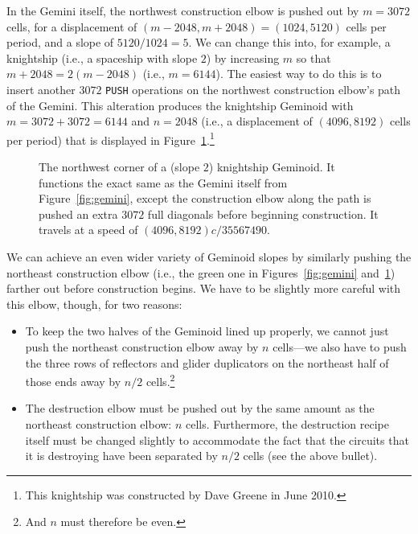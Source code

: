 In the Gemini itself, the northwest construction elbow is pushed out by $m = 3072$ cells, for a displacement of $(m-2048,m+2048) = (1024,5120)$ cells per period, and a slope of $5120/1024 = 5$. We can change this into, for example, a knightship (i.e., a spaceship with slope $2$) by increasing $m$ so that $m+2048 = 2(m-2048)$ (i.e., $m = 6144$). The easiest way to do this is to insert another $3072$ \texttt{PUSH} operations on the northwest construction elbow's path of the Gemini. This alteration produces the knightship Geminoid with $m = 3072 + 3072 = 6144$ and $n = 2048$ (i.e., a displacement of $(4096,8192)$ cells per period) that is displayed in Figure~\ref{fig:geminoid_knightship}.\footnote{This knightship was constructed by Dave Greene in June 2010.}

\begin{figure}[!htb]
	\centering
	\caption{The northwest corner of a (slope $2$) knightship Geminoid. It functions the exact same as the Gemini itself from Figure~\ref{fig:gemini}, except the construction elbow along the  path is pushed an extra $3072$ full diagonals before beginning construction. It travels at a speed of $(4096,8192)c/35567490$.}\label{fig:geminoid_knightship}
\end{figure}

We can achieve an even wider variety of Geminoid slopes by similarly pushing the northeast construction elbow (i.e., the green one in Figures~\ref{fig:gemini} and~\ref{fig:geminoid_knightship}) farther out before construction begins. We have to be slightly more careful with this elbow, though, for two reasons:\smallskip

\begin{itemize}
	\item To keep the two halves of the Geminoid lined up properly, we cannot just push the northeast construction elbow away by $n$ cells---we also have to push the three rows of reflectors and glider duplicators on the northeast half of those ends away by $n/2$ cells.\footnote{And $n$ must therefore be even.}\smallskip
	
	\item The destruction elbow must be pushed out by the same amount as the northeast construction elbow: $n$ cells. Furthermore, the destruction recipe itself must be changed slightly to accommodate the fact that the circuits that it is destroying have been separated by $n/2$ cells (see the above bullet).\smallskip
\end{itemize}

